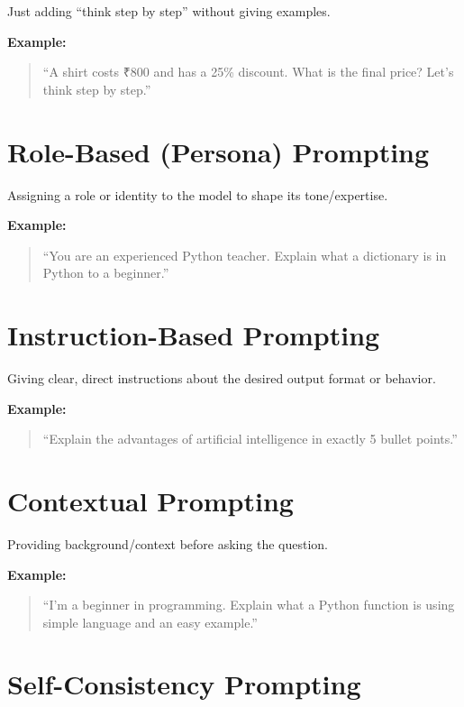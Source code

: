 \documentclass[12pt]{article}
\begin{document}
Just adding ``think step by step'' without giving examples.

\textbf{Example:}

\begin{quote}
``A shirt costs ₹800 and has a 25\% discount. What is the final price? Let's think step by step.''
\end{quote}


\section{Role-Based (Persona) Prompting}

Assigning a role or identity to the model to shape its tone/expertise.

\textbf{Example:}

\begin{quote}
``You are an experienced Python teacher. Explain what a dictionary is in Python to a beginner.''
\end{quote}


\section{Instruction-Based Prompting}

Giving clear, direct instructions about the desired output format or behavior.

\textbf{Example:}

\begin{quote}
``Explain the advantages of artificial intelligence in exactly 5 bullet points.''
\end{quote}


\section{Contextual Prompting}

Providing background/context before asking the question.

\textbf{Example:}

\begin{quote}
``I'm a beginner in programming. Explain what a Python function is using simple language and an easy example.''
\end{quote}


\section{Self-Consistency Prompting}
\end{document}
